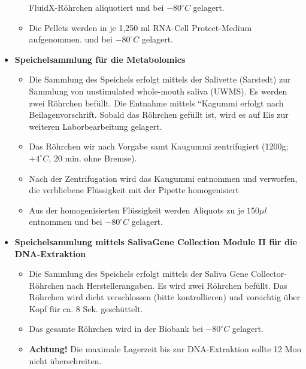 \begin{itemize}
\begin{itemize}
        FluidX-Röhrchen aliquotiert und bei $-80^{\circ}C$ gelagert.
      \item Die Pellets werden in je 1,250 ml RNA-Cell Protect-Medium
        aufgenommen. und bei $-80^{\circ}C$ gelagert.
    \end{itemize}
  \item \textbf{Speichelsammlung für die Metabolomics}
    \begin{itemize}
      \item Die Sammlung des Speichels erfolgt mittels der Salivette
        (Sarstedt) zur Sammlung von unstimulated whole-mouth saliva
        (UWMS). Es werden zwei Röhrchen befüllt. Die Entnahme mittels
        “Kagummi erfolgt nach Beilagenvorschrift. Sobald das Röhrchen
        gefüllt ist, wird es auf Eis zur weiteren Laborbearbeitung
        gelagert.
      \item Das Röhrchen wir nach Vorgabe samt Kaugummi zentrifugiert
        (1200g; $+4^{\circ}C$, 20 min. ohne Bremse).
      \item Nach der Zentrifugation wird das Kaugummi entnommen und
        verworfen, die verbliebene Flüssigkeit mit der Pipette
        homogenisiert
      \item Aus der homogenisierten Flüssigkeit werden Aliquots zu je
        $150\mu l$ entnommen und bei $-80^{\circ}C$ gelagert.
   \end{itemize}
  \item \textbf{Speichelsammlung mittels SalivaGene Collection Module II für die DNA-Extraktion}
    \begin{itemize}
      \item Die Sammlung des Speichels erfolgt mittels der Saliva Gene
        Collector-Röhrchen nach Herstellerangaben. Es wird zwei
        Röhrchen befüllt. Das Röhrchen wird dicht verschlossen (bitte
        kontrollieren) und vorsichtig über Kopf für ca. 8
        Sek. geschüttelt.
      \item Das gesamte Röhrchen wird in der Biobank bei $-80^{\circ}C$ gelagert.
      \item \textbf{Achtung!} Die maximale Lagerzeit bis zur DNA-Extraktion
        sollte 12 Mon nicht überschreiten.
    \end{itemize}
\end{itemize}    



